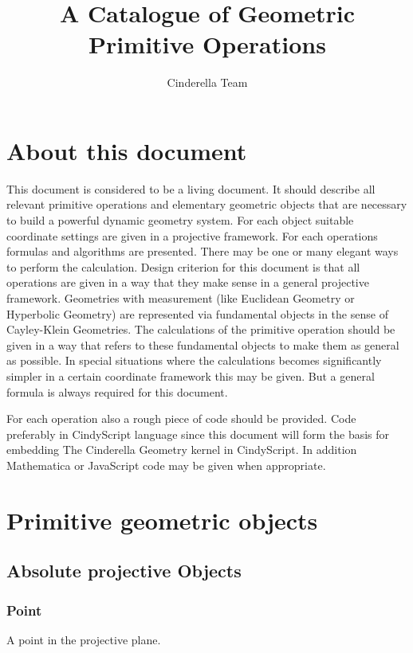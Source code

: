 \documentclass[11pt]{article}
\title{A Catalogue of Geometric Primitive Operations}
\author{
Cinderella Team
} %
\date{}					%
\begin{document}
\maketitle

\thispagestyle{empty}

\section*{About this document}
This document is considered to be a living document. It should describe all relevant primitive operations and elementary geometric objects that are necessary to build a powerful dynamic geometry system. For each object suitable coordinate settings are given in a projective framework. For each operations formulas and algorithms are presented.
There may be one or many elegant ways to perform the calculation. Design criterion for this document is that all operations are given in a way that they make sense in a general projective framework. Geometries with measurement (like Euclidean Geometry or Hyperbolic Geometry) are represented via fundamental objects in the sense of Cayley-Klein Geometries. The calculations of the primitive operation should be given in a way that refers to these fundamental objects to make them as general as possible. In special situations where the calculations becomes significantly simpler in a certain coordinate framework this may be given. But a general formula is always required for this document.

For each operation also a rough piece of code should be provided. Code preferably in CindyScript language since this document will form the basis for embedding The Cinderella Geometry kernel 
in CindyScript. In addition Mathematica or JavaScript code may be given when appropriate.
\newpage

\section{Primitive geometric objects}

\subsection{Absolute projective Objects}
\subsubsection{Point}
 A point in the projective plane.
\end{document}
